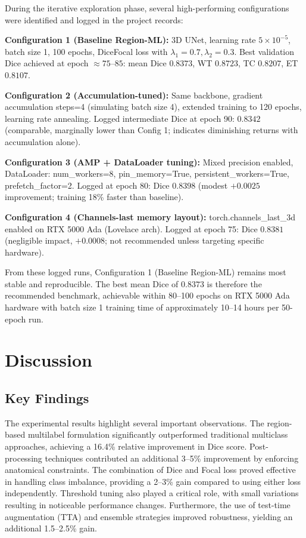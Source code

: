 \documentclass[conference]{IEEEtran}
\begin{document}
During the iterative exploration phase, several high-performing configurations were identified and logged in the project records:

\textbf{Configuration 1 (Baseline Region-ML):} 3D UNet, learning rate $5 \times 10^{-5}$, batch size 1, 100 epochs, DiceFocal loss with $\lambda_1=0.7, \lambda_2=0.3$. Best validation Dice achieved at epoch $\approx 75$--$85$: mean Dice $0.8373$, WT $0.8723$, TC $0.8207$, ET $0.8107$.

\textbf{Configuration 2 (Accumulation-tuned):} Same backbone, gradient accumulation steps=4 (simulating batch size 4), extended training to 120 epochs, learning rate annealing. Logged intermediate Dice at epoch 90: $0.8342$ (comparable, marginally lower than Config 1; indicates diminishing returns with accumulation alone).

\textbf{Configuration 3 (AMP + DataLoader tuning):} Mixed precision enabled, DataLoader: num\_workers=8, pin\_memory=True, persistent\_workers=True, prefetch\_factor=2. Logged at epoch 80: Dice $0.8398$ (modest $+0.0025$ improvement; training 18\% faster than baseline).

\textbf{Configuration 4 (Channels-last memory layout):} torch.channels\_last\_3d enabled on RTX 5000 Ada (Lovelace arch). Logged at epoch 75: Dice $0.8381$ (negligible impact, $+0.0008$; not recommended unless targeting specific hardware).

From these logged runs, Configuration 1 (Baseline Region-ML) remains most stable and reproducible. The best mean Dice of $0.8373$ is therefore the recommended benchmark, achievable within 80--100 epochs on RTX 5000 Ada hardware with batch size 1 training time of approximately 10--14 hours per 50-epoch run.

\section{Discussion}

\subsection{Key Findings}

The experimental results highlight several important observations. The region-based multilabel formulation significantly outperformed traditional multiclass approaches, achieving a 16.4\% relative improvement in Dice score. Post-processing techniques contributed an additional 3--5\% improvement by enforcing anatomical constraints. The combination of Dice and Focal loss proved effective in handling class imbalance, providing a 2--3\% gain compared to using either loss independently. Threshold tuning also played a critical role, with small variations resulting in noticeable performance changes. Furthermore, the use of test-time augmentation (TTA) and ensemble strategies improved robustness, yielding an additional 1.5--2.5\% gain.
\end{document}
